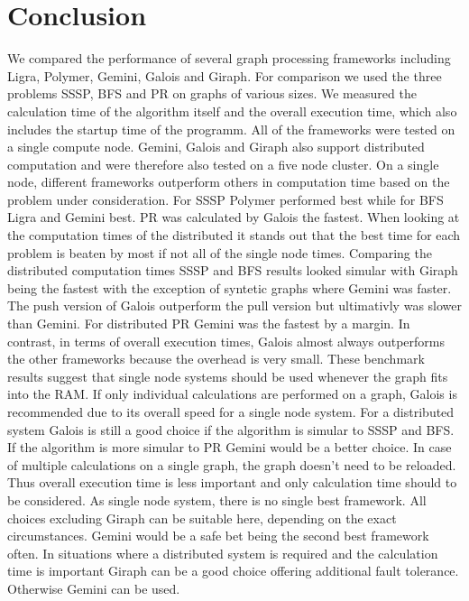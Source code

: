 
\section{Conclusion}

We compared the performance of several graph processing frameworks including Ligra, Polymer, Gemini, Galois and Giraph. 
For comparison we used the three problems SSSP, BFS and PR on graphs of various sizes.
We measured the calculation time of the algorithm itself and the overall execution time, which also includes the startup time of the programm.
All of the frameworks were tested on a single compute node. Gemini, Galois and Giraph also support distributed computation and were therefore also tested on a five node cluster.
On a single node, different frameworks outperform others in computation time based on the problem under consideration.
For SSSP Polymer performed best while for BFS Ligra and Gemini best. PR was calculated by Galois the fastest.
When looking at the computation times of the distributed it stands out that the best time for each problem is beaten by most if not all of the single node times.
Comparing the distributed computation times SSSP and BFS results looked simular with Giraph being the fastest with the exception of syntetic graphs where Gemini was faster. The push version of Galois outperform the pull version but ultimativly was slower than Gemini. For distributed PR Gemini was the fastest by a margin.
In contrast, in terms of overall execution times, Galois almost always outperforms the other frameworks because the overhead is very small.
These benchmark results suggest that single node systems should be used whenever the graph fits into the RAM. 
If only individual calculations are performed on a graph, Galois is recommended due to its overall speed for a single node system. 
For a distributed system Galois is still a good choice if the algorithm is simular to SSSP and BFS. If the algorithm is more simular to PR Gemini would be a better choice.
In case of multiple calculations on a single graph, the graph doesn't need to be reloaded. Thus overall execution time is less important and only calculation time should to be considered.
As single node system, there is no single best framework. All choices excluding Giraph can be suitable here, depending on the exact circumstances. Gemini would be a safe bet being the second best framework often. 
In situations where a distributed system is required and the calculation time is important Giraph can be a good choice offering additional fault tolerance. Otherwise Gemini can be used.

